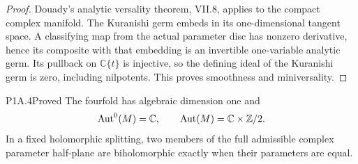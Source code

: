 \begin{proof}
Douady's analytic versality theorem, VII.8, applies to the
compact complex manifold. The Kuranishi germ embeds in its
one-dimensional tangent space. A classifying map from the
actual parameter disc has nonzero derivative, hence its
composite with that embedding is an invertible one-variable
analytic germ. Its pullback on $\mathbb C\{t\}$ is injective,
so the defining ideal of the Kuranishi germ is zero, including
nilpotents. This proves smoothness and miniversality.
\end{proof}

\begin{statement}{P1A.4}{Proved}
The fourfold has algebraic dimension one and
\[
\operatorname{Aut}^0(M)=\mathbb C,\qquad
\operatorname{Aut}(M)=\mathbb C\times\mathbb Z/2.
\]
In a fixed holomorphic splitting, two members of the full
admissible complex parameter half-plane are biholomorphic
exactly when their parameters are equal.
\end{statement}
